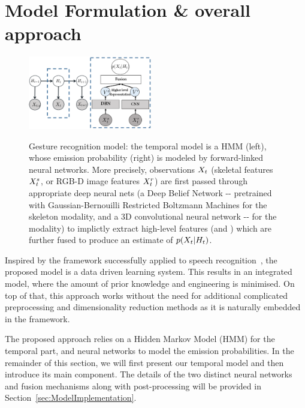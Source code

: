 

\section{Model Formulation \& overall approach}
\label{sec:approach}

\begin{figure}[t]
  \centering
  \includegraphics[width=0.48\textwidth]{images/GraphicalModel_new2}\\
  \caption{Gesture recognition model: the temporal model is a HMM (left), whose emission probability
\emissionprob{} (right) is modeled by forward-linked neural networks.
More precisely, observations $X_t$ (skeletal features $X^{s}_t$, or RGB-D image features $X^{r}_t$)
are first passed through appropriate deep neural nets (a Deep Belief Network -\DBN- pretrained with Gaussian-Bernouilli Restricted Boltzmann Machines
for the skeleton modality, and
 a 3D convolutional neural network -\ThreeDCNN- for the \RGBD  modality) to implictly extract high-level features (\highSK and \highRGBD)
which are further fused to produce an estimate of $p(X_t|H_t)$.
}
\label{fig:GM}
\end{figure}

Inspired by the framework successfully applied to speech recognition~\cite{mohamed2012acoustic}, the proposed model is a data driven learning system. This results in an integrated model, where the amount of prior knowledge and engineering is minimised. On top of that, this approach works without the need for additional complicated preprocessing and dimensionality reduction methods as it is naturally embedded in the framework.

The proposed approach relies on a Hidden Markov Model (HMM) for the temporal part,
and neural networks to model the emission probabilities.
 In the remainder of this section, we will first present our temporal model and then introduce its main component.
The details of the two distinct neural networks and fusion mechanisms along with post-processing will be provided
in Section~\ref{sec:ModelImplementation}.


